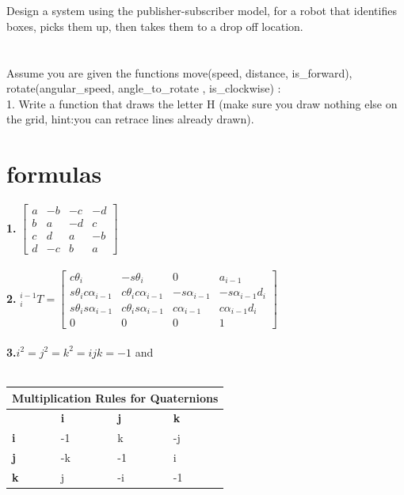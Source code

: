 \documentclass{article}
\begin{document}
\newpage

\section{}
Design a system using the publisher-subscriber model, for a robot that identifies boxes, picks them up, then takes them to a drop off location.
\newpage

\section{}
Assume you are given the functions move(speed, distance, is\_forward), rotate(angular\_speed, angle\_to\_rotate , is\_clockwise) :\\
1. Write a function that draws the letter H (make sure you draw nothing else on the grid, hint:you can retrace lines already drawn).\\


\newpage
\section{formulas}
\textbf{1. } $\begin{bmatrix}
a & -b & -c & -d\\
b & a & -d & c\\
c & d & a & -b \\
d & -c & b & a
\end{bmatrix}$\\\\
\textbf{2. } ${}^{i-1}_{i}T=\begin{bmatrix}
                c\theta_i & -s\theta_i & 0 & a_{i-1}\\
                s\theta_ic\alpha_{i-1} & c\theta_ic\alpha_{i-1} & -s\alpha_{i-1} & -s\alpha_{i-1}d_{i}\\
                s\theta_is\alpha_{i-1} & c\theta_is\alpha_{i-1}& c\alpha_{i-1} & c\alpha_{i-1}d_{i}\\
                0 & 0 & 0 & 1
               \end{bmatrix}$\\\\
\textbf{3.}$i^2=j^2=k^2=ijk=-1$ and \\\\
\begin{tabular}{ |p{3cm}|p{3cm}|p{3cm}| p{3cm} |}
\hline
\multicolumn{4}{|c|}{Multiplication Rules for Quaternions} \\
\hline
 & \textbf{i} & \textbf{j} & \textbf{k} \\
\hline
\textbf{i} & -1 & k & -j\\
\textbf{j} & -k & -1 & i\\
\textbf{k} & j & -i & -1\\
\hline
\end{tabular}\\
\end{document}
